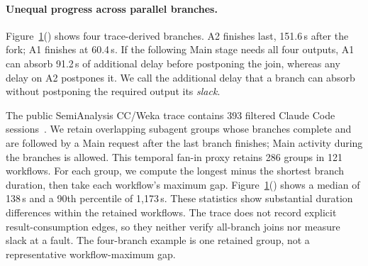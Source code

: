 \begin{figure}[t]
  \label{fig:motivation}
\end{figure}

\paragraph{Unequal progress across parallel branches.}
\label{sec:motivation-workflow}
Figure~\ref{fig:motivation}() shows four
trace-derived branches. A2 finishes last, 151.6\,s after the fork;
A1 finishes at 60.4\,s. If the following Main stage needs all four outputs,
A1 can absorb 91.2\,s of additional delay before postponing the join,
whereas any delay on A2 postpones it. We call the additional delay that
a branch can absorb without postponing the required output its
\emph{slack}.

The public SemiAnalysis CC/Weka trace contains 393 filtered Claude Code
sessions~\cite{semianalysis2026cctraces}. We retain overlapping subagent
groups whose branches complete and are followed by a Main request after
the last branch finishes; Main activity during the branches is allowed.
This temporal fan-in proxy retains 286 groups in 121 workflows.
For each group, we compute the longest minus the shortest branch duration,
then take each workflow's maximum gap.
Figure~\ref{fig:motivation}() shows a
median of 138\,s and a 90th percentile of 1,173\,s. These statistics show
substantial duration differences within the retained workflows.
The trace does not record explicit result-consumption edges, so they
neither verify all-branch joins nor measure slack at a fault. The
four-branch example is one retained group, not a representative
workflow-maximum gap.

